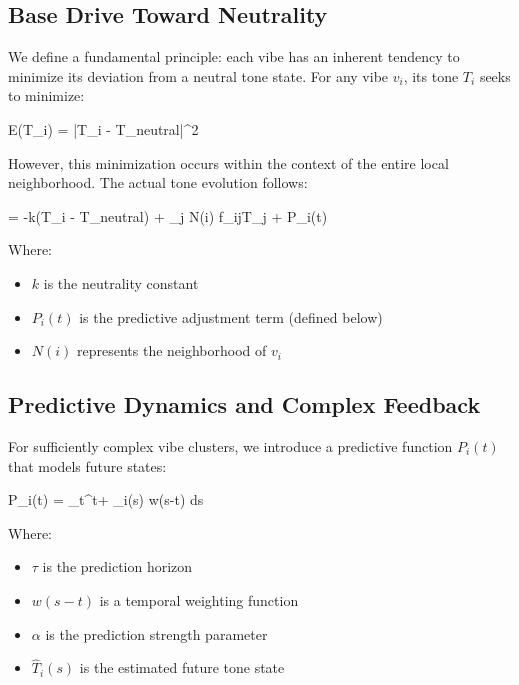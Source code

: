 \documentclass{article}
\let\oldequation\equation
\let\endoldequation\endequation
\renewenvironment{equation}{%
    \noindent\vspace{-\parskip}\vspace{-\baselineskip}%
    \oldequation
}{%
    \endoldequation
    \noindent\vspace{-\parskip}\vspace{-\baselineskip}%
}
\theoremstyle{definition}
\theoremstyle{axiom}
\theoremstyle{theorem}
\theoremstyle{proposition}
\begin{document}
\subsection{Base Drive Toward Neutrality}

We define a fundamental principle: each vibe has an inherent tendency to minimize its deviation from a neutral tone state. For any vibe $v_i$, its tone $T_i$ seeks to minimize:

\begin{equation}
E(T_i) = |T_i - T_{neutral}|^2
\end{equation}

However, this minimization occurs within the context of the entire local neighborhood. The actual tone evolution follows:

\begin{equation}
 = -k(T_i - T_{neutral}) + \sum_{j \in N(i)} f_{ij}T_j + P_i(t)
\end{equation}

Where:
\begin{itemize}
\item $k$ is the neutrality constant
\item $P_i(t)$ is the predictive adjustment term (defined below)
\item $N(i)$ represents the neighborhood of $v_i$
\end{itemize}

\subsection{Predictive Dynamics and Complex Feedback}

For sufficiently complex vibe clusters, we introduce a predictive function $P_i(t)$ that models future states:

\begin{equation}
P_i(t) = \alpha \int_{t}^{t+\tau} _i(s) w(s-t) ds
\end{equation}

Where:
\begin{itemize}
\item $\tau$ is the prediction horizon
\item $w(s-t)$ is a temporal weighting function
\item $\alpha$ is the prediction strength parameter
\item $\hat{T}_i(s)$ is the estimated future tone state
\end{itemize}
\end{document}
